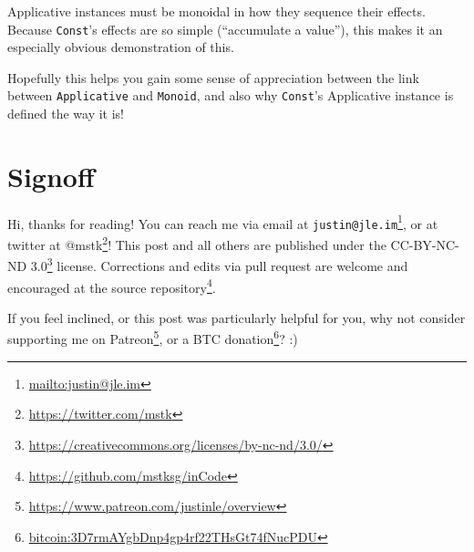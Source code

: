 \documentclass[]{article}
\renewcommand{\href}[2]{#2\footnote{\url{#1}}}
\begin{document}
Applicative instances must be monoidal in how they sequence their effects.
Because \texttt{Const}'s effects are so simple (``accumulate a value''), this
makes it an especially obvious demonstration of this.

Hopefully this helps you gain some sense of appreciation between the link
between \texttt{Applicative} and \texttt{Monoid}, and also why \texttt{Const}'s
Applicative instance is defined the way it is!

\hypertarget{signoff}{%
\section{Signoff}\label{signoff}}

Hi, thanks for reading! You can reach me via email at
\href{mailto:justin@jle.im}{\nolinkurl{justin@jle.im}}, or at twitter at
\href{https://twitter.com/mstk}{@mstk}! This post and all others are published
under the \href{https://creativecommons.org/licenses/by-nc-nd/3.0/}{CC-BY-NC-ND
3.0} license. Corrections and edits via pull request are welcome and encouraged
at \href{https://github.com/mstksg/inCode}{the source repository}.

If you feel inclined, or this post was particularly helpful for you, why not
consider \href{https://www.patreon.com/justinle/overview}{supporting me on
Patreon}, or a \href{bitcoin:3D7rmAYgbDnp4gp4rf22THsGt74fNucPDU}{BTC donation}?
:)
\end{document}
